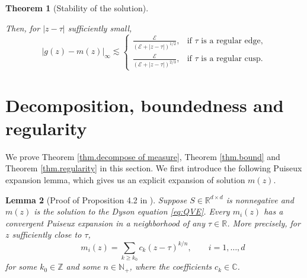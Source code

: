 \documentclass[11pt,twoside, a4paper]{article}
\numberwithin{equation}{section}
\numberwithin{figure}{section}
\theoremstyle{plain} %
\newtheorem{theorem}{Theorem}[section]
\newtheorem{lemma}[theorem]{Lemma}
\theoremstyle{definition}
\theoremstyle{remark}
\newcommand{\1} {\mspace{1 mu}}
\newcommand{\2} {\mspace{2 mu}}
\newcommand{\R} {\mathbb{R}}
\newcommand{\N} {{\mathbb{N}}}
\begin{document}
\begin{theorem}[Stability of the solution]
\begin{itemize}
\begin{equation}
\end{equation}
Then, for $|z-\tau|$ sufficiently small,
\begin{equation}\label{eq:nonlinear-boundary-stability}
|g(z)-m(z)|_\infty
\lesssim
\begin{cases}
\displaystyle
\frac{\mathcal{E}}
     {(\mathcal E+|z-\tau|)^{1/2}},
&
\text{if $\tau$ is a regular edge},
\\[3mm]
\displaystyle
\frac{\mathcal{E}}
     {(\mathcal{E}+|z-\tau|)^{2/3}},
&
\text{if $\tau$ is a regular cusp}.
\end{cases}
\end{equation}
\end{itemize}
\end{theorem}



\section{Decomposition, boundedness and regularity}\label{sec.decomposition}

We prove Theorem \ref{thm.decompose of measure}, Theorem \ref{thm.bound} and Theorem \ref{thm.regularity} in this section. We first introduce the following Puiseux expansion lemma, which gives us an explicit expansion of solution $m(z)$.

\begin{lemma}[Proof of Proposition 4.2 in \cite{AnantharamanSabri2019}]\label{lem:puiseux}
  Suppose $S\in\R^{d\times d}$ is nonnegative and $m(z)$ is the solution to the Dyson equation \eqref{eq:QVE}. Every $m_i(z)$ has a convergent \emph{Puiseux expansion} in a neighborhood of any $\tau\in\R$. More precisely, for $z$ sufficiently close to $\tau$,
  \begin{equation}
    \qquad m_i(z)=\sum_{k\ge k_0} c_k(z-\tau)^{k/n},\qquad i=1,\dots, d
  \end{equation}
  for some $k_0\in\mathbb Z$ and some $n\in\N_+$, where the coefficients \(c_k\in\mathbb C\).
\end{lemma}
\end{document}
